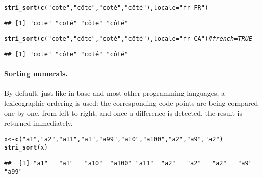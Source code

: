 \documentclass[nojss]{jss}\usepackage[]{graphicx}\usepackage[]{xcolor}
\makeatletter
\newcommand{\hlstr}[1]{\textcolor[rgb]{0.192,0.494,0.8}{#1}}%
\newcommand{\hlcom}[1]{\textcolor[rgb]{0.678,0.584,0.686}{\textit{#1}}}%
\newcommand{\hlstd}[1]{\textcolor[rgb]{0.345,0.345,0.345}{#1}}%
\newcommand{\hlkwb}[1]{\textcolor[rgb]{0.69,0.353,0.396}{#1}}%
\newcommand{\hlkwc}[1]{\textcolor[rgb]{0.333,0.667,0.333}{#1}}%
\newcommand{\hlkwd}[1]{\textcolor[rgb]{0.737,0.353,0.396}{\textbf{#1}}}%
\newenvironment{kframe}{%
 \def\at@end@of@kframe{}%
 \ifinner\ifhmode%
  \def\at@end@of@kframe{\end{minipage}}%
  \begin{minipage}{\columnwidth}%
 \fi\fi%
 \def\FrameCommand##1{\hskip\@totalleftmargin \hskip-\fboxsep
 \colorbox{shadecolor}{##1}\hskip-\fboxsep
     \hskip-\linewidth \hskip-\@totalleftmargin \hskip\columnwidth}%
 \MakeFramed {\advance\hsize-\width
   \@totalleftmargin\z@ \linewidth\hsize
   \@setminipage}}%
 {\par\unskip\endMakeFramed%
 \at@end@of@kframe}
\newenvironment{knitrout}{}{} %
\makeatother
\begin{document}
\begin{knitrout}
\color{fgcolor}\begin{kframe}
\begin{alltt}
\hlkwd{stri_sort}\hlstd{(}\hlkwd{c}\hlstd{(}\hlstr{"cote"}\hlstd{,} \hlstr{"côte"}\hlstd{,} \hlstr{"coté"}\hlstd{,} \hlstr{"côté"}\hlstd{),} \hlkwc{locale}\hlstd{=}\hlstr{"fr_FR"}\hlstd{)}
\end{alltt}
\begin{verbatim}
## [1] "cote" "coté" "côte" "côté"
\end{verbatim}
\begin{alltt}
\hlkwd{stri_sort}\hlstd{(}\hlkwd{c}\hlstd{(}\hlstr{"cote"}\hlstd{,} \hlstr{"côte"}\hlstd{,} \hlstr{"coté"}\hlstd{,} \hlstr{"côté"}\hlstd{),} \hlkwc{locale}\hlstd{=}\hlstr{"fr_CA"}\hlstd{)} \hlcom{# french=TRUE}
\end{alltt}
\begin{verbatim}
## [1] "cote" "côte" "coté" "côté"
\end{verbatim}
\end{kframe}
\end{knitrout}



\paragraph{Sorting numerals.}
By default, just like in base  and most other programming
languages, a lexicographic ordering is used: the corresponding
code points are being compared one by one, from left to right,
and once a difference
is detected, the result is returned immediately.

\begin{knitrout}
\color{fgcolor}\begin{kframe}
\begin{alltt}
\hlstd{x} \hlkwb{<-} \hlkwd{c}\hlstd{(}\hlstr{"a1"}\hlstd{,} \hlstr{"a2"}\hlstd{,} \hlstr{"a11"}\hlstd{,} \hlstr{"a1"}\hlstd{,} \hlstr{"a99"}\hlstd{,} \hlstr{"a10"}\hlstd{,} \hlstr{"a100"}\hlstd{,} \hlstr{"a2"}\hlstd{,} \hlstr{"a9"}\hlstd{,} \hlstr{"a2"}\hlstd{)}
\hlkwd{stri_sort}\hlstd{(x)}
\end{alltt}
\begin{verbatim}
##  [1] "a1"   "a1"   "a10"  "a100" "a11"  "a2"   "a2"   "a2"   "a9"   "a99"
\end{verbatim}
\end{kframe}
\end{knitrout}
\end{document}
